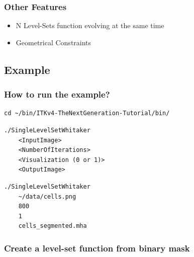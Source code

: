 
\begin{frame}
\frametitle{Other Features}
  \begin{itemize}
    \item N Level-Sets function evolving at the same time
    \item Geometrical Constraints
  \end{itemize}
\end{frame}

\subsection{Example}


\begin{frame}[fragile]
  \frametitle{How to run the example?}
  \fontsize{8pt}{8pt}\selectfont
\begin{verbatim}
cd ~/bin/ITKv4-TheNextGeneration-Tutorial/bin/
\end{verbatim}

\begin{verbatim}
./SingleLevelSetWhitaker
    <InputImage>
    <NumberOfIterations>
    <Visualization (0 or 1)>
    <OutputImage>
\end{verbatim}

\begin{verbatim}
./SingleLevelSetWhitaker
    ~/data/cells.png
    800
    1
    cells_segmented.mha
\end{verbatim}
\end{frame}

\begin{frame}
  \frametitle{Create a level-set function from binary mask}
\end{frame}

